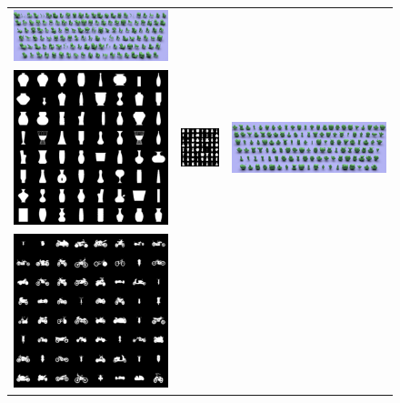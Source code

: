 \begin{figure}[h!]
\begin{center}
\begin{tabular}{ccc}
    \includegraphics[height=\fh]{prgan/fig/chair/output.png} \\
    \includegraphics[height=\fh]{prgan/fig/vase/samples.png} & 
    \includegraphics[height=\fh]{prgan/fig/vase/450.png} & 
    \includegraphics[height=\fh]{prgan/fig/vase/output.png} \\
    \includegraphics[height=\fh]{prgan/fig/bike/samples.png} & 

\end{tabular}
\end{center}
\end{figure}
